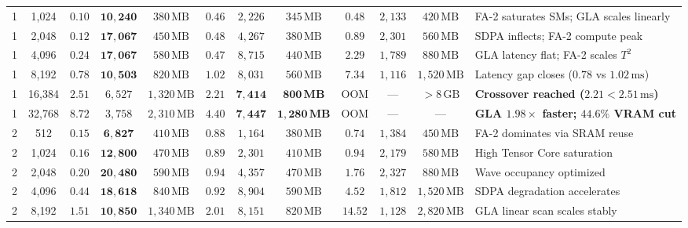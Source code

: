 \begin{table}[t]
{\begin{tabular}{cc ccc ccc ccc l}
1 & 1,024  & $\mathbf{0.10}$ & $\mathbf{10{,}240}$ & $380\,\text{MB}$ & $0.46$ & $2{,}226$ & $345\,\text{MB}$ & $0.48$ & $2{,}133$ & $420\,\text{MB}$ & FA-2 saturates SMs; GLA scales linearly \\
1 & 2,048  & $\mathbf{0.12}$ & $\mathbf{17{,}067}$ & $450\,\text{MB}$ & $0.48$ & $4{,}267$ & $380\,\text{MB}$ & $0.89$ & $2{,}301$ & $560\,\text{MB}$ & SDPA inflects; FA-2 compute peak \\
1 & 4,096  & $\mathbf{0.24}$ & $\mathbf{17{,}067}$ & $580\,\text{MB}$ & $0.47$ & $8{,}715$ & $440\,\text{MB}$ & $2.29$ & $1{,}789$ & $880\,\text{MB}$ & GLA latency flat; FA-2 scales $T^2$ \\
1 & 8,192  & $\mathbf{0.78}$ & $\mathbf{10{,}503}$ & $820\,\text{MB}$ & $1.02$ & $8{,}031$ & $560\,\text{MB}$ & $7.34$ & $1{,}116$ & $1{,}520\,\text{MB}$ & Latency gap closes ($0.78$ vs $1.02\,\text{ms}$) \\
1 & 16,384 & $2.51$          & $6{,}527$          & $1{,}320\,\text{MB}$ & $\mathbf{2.21}$ & $\mathbf{7{,}414}$ & $\mathbf{800\,\text{MB}}$ & OOM & — & $>8\,\text{GB}$ & \textbf{Crossover reached ($2.21 < 2.51\,\text{ms}$)} \\
1 & 32,768 & $8.72$          & $3{,}758$          & $2{,}310\,\text{MB}$ & $\mathbf{4.40}$ & $\mathbf{7{,}447}$ & $\mathbf{1{,}280\,\text{MB}}$ & OOM & — & — & \textbf{GLA $1.98\times$ faster; $44.6\%$ VRAM cut} \\
\midrule
2 & 512    & $\mathbf{0.15}$ & $\mathbf{6{,}827}$  & $410\,\text{MB}$ & $0.88$ & $1{,}164$ & $380\,\text{MB}$ & $0.74$ & $1{,}384$ & $450\,\text{MB}$ & FA-2 dominates via SRAM reuse \\
2 & 1,024  & $\mathbf{0.16}$ & $\mathbf{12{,}800}$ & $470\,\text{MB}$ & $0.89$ & $2{,}301$ & $410\,\text{MB}$ & $0.94$ & $2{,}179$ & $580\,\text{MB}$ & High Tensor Core saturation \\
2 & 2,048  & $\mathbf{0.20}$ & $\mathbf{20{,}480}$ & $590\,\text{MB}$ & $0.94$ & $4{,}357$ & $470\,\text{MB}$ & $1.76$ & $2{,}327$ & $880\,\text{MB}$ & Wave occupancy optimized \\
2 & 4,096  & $\mathbf{0.44}$ & $\mathbf{18{,}618}$ & $840\,\text{MB}$ & $0.92$ & $8{,}904$ & $590\,\text{MB}$ & $4.52$ & $1{,}812$ & $1{,}520\,\text{MB}$ & SDPA degradation accelerates \\
2 & 8,192  & $\mathbf{1.51}$ & $\mathbf{10{,}850}$ & $1{,}340\,\text{MB}$ & $2.01$ & $8{,}151$ & $820\,\text{MB}$ & $14.52$ & $1{,}128$ & $2{,}820\,\text{MB}$ & GLA linear scan scales stably \\

\end{tabular}}
\end{table}
